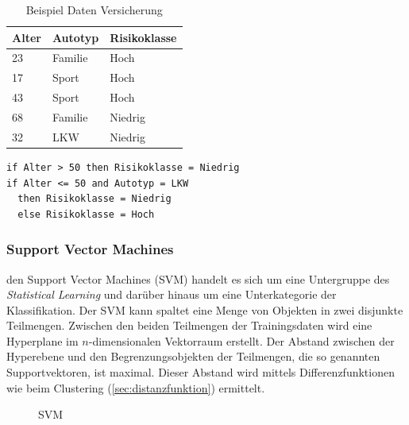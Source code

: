 \documentclass[12pt,journal,compsoc,ngerman]{IEEEtran}
\begin{document}
\begin{table}[!t]
\caption{Beispiel Daten Versicherung}
\centering
\begin{tabular}{l|l|l}\hline
Alter	& Autotyp	& Risikoklasse \\\hline
23	& Familie	& Hoch\\
17	& Sport		& Hoch\\
43	& Sport		& Hoch\\
68	& Familie	& Niedrig\\
32	& LKW		& Niedrig
\end{tabular}
\label{tab:trainingdata}
\end{table}
\begin{lstlisting}[caption={Entscheidungsbaum},label=list:dt,frame=single,floatplacement=t]
if Alter > 50 then Risikoklasse = Niedrig
if Alter <= 50 and Autotyp = LKW 
  then Risikoklasse = Niedrig
  else Risikoklasse = Hoch
\end{lstlisting}

\subsubsection{Support Vector Machines}
 den Support Vector Machines (SVM) handelt es sich um eine Untergruppe des \emph{Statistical Learning} und darüber hinaus um eine Unterkategorie der Klassifikation. Der SVM kann spaltet eine Menge von Objekten in zwei 
disjunkte Teilmengen. Zwischen den beiden Teilmengen der Trainingsdaten wird 
eine Hyperplane im $n$-dimensionalen Vektorraum erstellt. Der Abstand zwischen der
Hyperebene und den Begrenzungsobjekten der Teilmengen, die so genannten Supportvektoren, 
ist maximal. Dieser Abstand wird mittels Differenzfunktionen wie beim Clustering 
(\cref{sec:distanzfunktion}) ermittelt.

\begin{figure}[!t]
\centering
\subfigure[Gesucht]{\scalebox{0.42}{}\label{fig:hyperplane_gesucht}}
\subfigure[Gefunden]{\scalebox{0.42}{}\label{fig:hyperplane_gefunden}}
\subfigure[Einordnung]{\scalebox{0.49}{}\label{fig:einordnung}}
\caption{SVM}
\label{fig:svm}
\end{figure}
\end{document}
